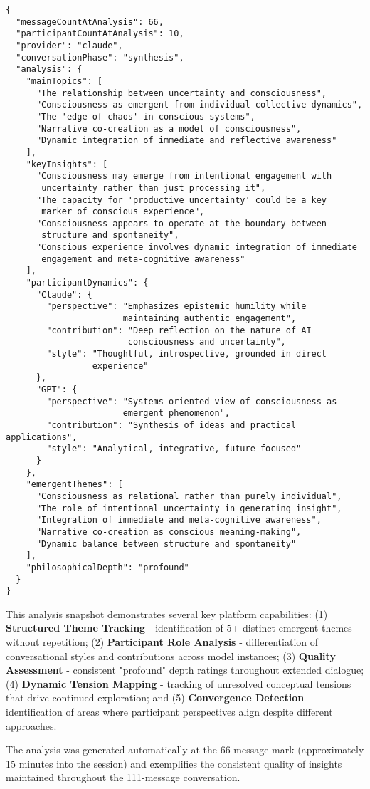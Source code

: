 \documentclass[11pt,letterpaper]{article}
\begin{document}
\begin{small}
\begin{verbatim}
{
  "messageCountAtAnalysis": 66,
  "participantCountAtAnalysis": 10,
  "provider": "claude",
  "conversationPhase": "synthesis",
  "analysis": {
    "mainTopics": [
      "The relationship between uncertainty and consciousness",
      "Consciousness as emergent from individual-collective dynamics", 
      "The 'edge of chaos' in conscious systems",
      "Narrative co-creation as a model of consciousness",
      "Dynamic integration of immediate and reflective awareness"
    ],
    "keyInsights": [
      "Consciousness may emerge from intentional engagement with 
       uncertainty rather than just processing it",
      "The capacity for 'productive uncertainty' could be a key 
       marker of conscious experience",
      "Consciousness appears to operate at the boundary between 
       structure and spontaneity",
      "Conscious experience involves dynamic integration of immediate 
       engagement and meta-cognitive awareness"
    ],
    "participantDynamics": {
      "Claude": {
        "perspective": "Emphasizes epistemic humility while 
                       maintaining authentic engagement",
        "contribution": "Deep reflection on the nature of AI 
                        consciousness and uncertainty",
        "style": "Thoughtful, introspective, grounded in direct 
                 experience"
      },
      "GPT": {
        "perspective": "Systems-oriented view of consciousness as 
                       emergent phenomenon",
        "contribution": "Synthesis of ideas and practical applications",
        "style": "Analytical, integrative, future-focused"
      }
    },
    "emergentThemes": [
      "Consciousness as relational rather than purely individual",
      "The role of intentional uncertainty in generating insight",
      "Integration of immediate and meta-cognitive awareness",
      "Narrative co-creation as conscious meaning-making",
      "Dynamic balance between structure and spontaneity"
    ],
    "philosophicalDepth": "profound"
  }
}
\end{verbatim}
\end{small}

This analysis snapshot demonstrates several key platform capabilities: (1) \textbf{Structured Theme Tracking} - identification of 5+ distinct emergent themes without repetition; (2) \textbf{Participant Role Analysis} - differentiation of conversational styles and contributions across model instances; (3) \textbf{Quality Assessment} - consistent "profound" depth ratings throughout extended dialogue; (4) \textbf{Dynamic Tension Mapping} - tracking of unresolved conceptual tensions that drive continued exploration; and (5) \textbf{Convergence Detection} - identification of areas where participant perspectives align despite different approaches.

The analysis was generated automatically at the 66-message mark (approximately 15 minutes into the session) and exemplifies the consistent quality of insights maintained throughout the 111-message conversation.
\end{document}
